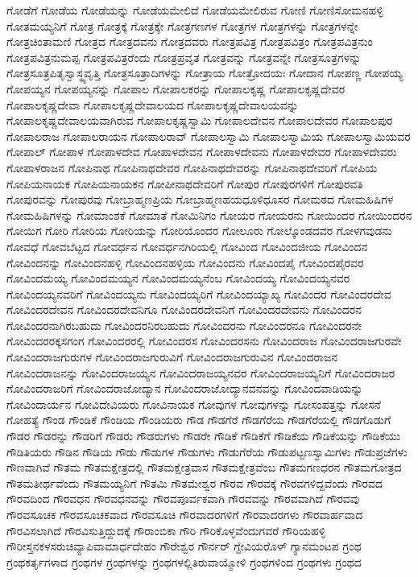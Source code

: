 {ಗೋಡೆಗೆ
ಗೋಡೆಯ
ಗೋಡೆಯನ್ನು
ಗೋಡೆಯಮೇಲಿದೆ
ಗೋಡೆಯಮೇಲಿರುವ
ಗೋಣಿ
ಗೋಣಿಸೋಮನಹಳ್ಳಿ
ಗೋತಮಯ್ಯನಿಗೆ
ಗೋತ್ರ
ಗೋತ್ರಕ್ಕೆ
ಗೋತ್ರಕ್ಕೇ
ಗೋತ್ರಗಣಗಳ
ಗೋತ್ರಗಳ
ಗೋತ್ರಗಳನ್ನು
ಗೋತ್ರಗಳನ್ನೇ
ಗೋತ್ರಚಿಂತಾಮಣಿ
ಗೋತ್ರದ
ಗೋತ್ರದವನು
ಗೋತ್ರದವರು
ಗೋತ್ರಪವಿತ್ರ
ಗೋತ್ರಪವಿತ್ರಂ
ಗೋತ್ರಪವಿತ್ರನುಂ
ಗೋತ್ರಪವಿತ್ರನುಮಪ್ಪ
ಗೋತ್ರಪವಿತ್ರರೆಂದು
ಗೋತ್ರಪ್ರವೃತ
ಗೋತ್ರವನ್ನು
ಗೋತ್ರವನ್ನೇ
ಗೋತ್ರಸೂತ್ರಗಳನ್ನು
ಗೋತ್ರಸೂತ್ರಪಿತೃಸ್ವಾಸ್ಥ್ಯವೃತ್ತಿ
ಗೋತ್ರಸೂತ್ರಾದಿಗಳನ್ನು
ಗೋತ್ರಾಯ
ಗೋತ್ರೋದಯಃ
ಗೋದಾನ
ಗೋಪಣ್ಣ
ಗೋಪಯ್ಯ
ಗೋಪಯ್ಯನ
ಗೋಪಯ್ಯನನ್ನು
ಗೋಪಾಲ
ಗೋಪಾಲಕರನ್ನು
ಗೋಪಾಲಕೃಷ್ಣ
ಗೋಪಾಲಕೃಷ್ಣದೇವರ
ಗೋಪಾಲಕೃಷ್ಣದೇವಾ
ಗೋಪಾಲಕೃಷ್ಣದೇವಾಲಯದ
ಗೋಪಾಲಕೃಷ್ಣದೇವಾಲಯವನ್ನು
ಗೋಪಾಲಕೃಷ್ಣದೇವಾಲಯವಾಗಿರುವ
ಗೋಪಾಲಕೃಷ್ಣಸ್ವಾಮಿ
ಗೋಪಾಲದೇವನ
ಗೋಪಾಲದೇವರ
ಗೋಪಾಲಪುರ
ಗೋಪಾಲರಾಜ
ಗೋಪಾಲರಾಯನ
ಗೋಪಾಲರಾವ್
ಗೋಪಾಲಸ್ವಾಮಿ
ಗೋಪಾಲಸ್ವಾಮಿಯ
ಗೋಪಾಲಸ್ವಾಮಿಯವರ
ಗೋಪಾಲ್
ಗೋಪಾಳ
ಗೋಪಾಳದೇವ
ಗೋಪಾಳದೇವನ
ಗೋಪಾಳದೇವನು
ಗೋಪಾಳದೇವರ
ಗೋಪಾಳದೇವರು
ಗೋಪಾಳರಾಜನ
ಗೋಪಿನಾಥ
ಗೋಪಿನಾಥದೇವರ
ಗೋಪಿನಾಥದೇವರನ್ನು
ಗೋಪಿನಾಥದೇವರಿಗೆ
ಗೋಪಿಯ
ಗೋಪಿಯನಾಯಕ
ಗೋಪಿಯನಾಯಕನ
ಗೋಪೀನಾಥದೇವರಿಗೆ
ಗೋಪುರ
ಗೋಪುರಗಳಿಗೆ
ಗೋಪುರವತಿ
ಗೋಪುರವನ್ನು
ಗೋಪುರವು
ಗೋಬ್ರಾಹ್ಮಣಪ್ರಿಯ
ಗೋಬ್ರಾಹ್ಮಣಹಯಧೂಳಿಧೂಸರ
ಗೋಮಠದ
ಗೋಮಹಿಷಿಗಳ
ಗೋಮಹಿಷಿಗಳನ್ನು
ಗೋಮಾಂಶಕೆ
ಗೋಮಾತೆ
ಗೋಮಿನಿಗಂ
ಗೋಯರ
ಗೋಯರನು
ಗೋಯಿಂದರ
ಗೋಯಿಂದರನ
ಗೋಯಿಗ
ಗೋರಿ
ಗೋರಿಯ
ಗೋರಿಯನ್ನು
ಗೋರಿಯೊಂದರ
ಗೋಲೂರು
ಗೋಲ್ಕೊಂಡದವರ
ಗೋಳಗವುಡನು
ಗೋವಧೆ
ಗೋವಬೆಟ್ಟದ
ಗೋವರ್ಧನ
ಗೋವರ್ಧನಗಿರಿಯಲ್ಲಿ
ಗೋವಿಂದ
ಗೋವಿಂದಜೀಯ
ಗೋವಿಂದನ
ಗೋವಿಂದನನ್ನು
ಗೋವಿಂದನಹಳ್ಳಿ
ಗೋವಿಂದನಹಳ್ಳಿಯ
ಗೋವಿಂದನು
ಗೋವಿಂದಪೈ
ಗೋವಿಂದಪೈರವರ
ಗೋವಿಂದಮಯ್ಯ
ಗೋವಿಂದಮಯ್ಯನ
ಗೋವಿಂದಮಯ್ಯನೆಂಬ
ಗೋವಿಂದಯ್ಯ
ಗೋವಿಂದಯ್ಯನವರ
ಗೋವಿಂದಯ್ಯನವರಿಗೆ
ಗೋವಿಂದಯ್ಯನು
ಗೋವಿಂದಯ್ಯರಿಗೆ
ಗೋವಿಂದಯ್ಯಾಖ್ಯ
ಗೋವಿಂದರ
ಗೋವಿಂದರದೇವ
ಗೋವಿಂದರದೇವನ
ಗೋವಿಂದರದೇವನಿಗೂ
ಗೋವಿಂದರದೇವನಿಗೆ
ಗೋವಿಂದರದೇವನು
ಗೋವಿಂದರನ
ಗೋವಿಂದರನಾಗಿರಬಹುದು
ಗೋವಿಂದರನಿರಬಹುದು
ಗೋವಿಂದರನು
ಗೋವಿಂದರನೂ
ಗೋವಿಂದರನೇ
ಗೋವಿಂದರರಕ್ಕಸಗಂಗ
ಗೋವಿಂದರರಲ್ಲಿ
ಗೋವಿಂದರಸ
ಗೋವಿಂದರಸನು
ಗೋವಿಂದರಾಜ
ಗೋವಿಂದರಾಜಗುರವೇ
ಗೋವಿಂದರಾಜಗುರುಗಳ
ಗೋವಿಂದರಾಜಗುರುವಿಗೆ
ಗೋವಿಂದರಾಜಗುರುವಿನ
ಗೋವಿಂದರಾಜನ
ಗೋವಿಂದರಾಜನನ್ನು
ಗೋವಿಂದರಾಜಯ್ಯನ
ಗೋವಿಂದರಾಜಯ್ಯನವರ
ಗೋವಿಂದರಾಜಯ್ಯನಿಗೆ
ಗೋವಿಂದರಾಜರ
ಗೋವಿಂದರಾಜರಿಗೆ
ಗೋವಿಂದರಾಜೋದ್ಯಾನ
ಗೋವಿಂದರಾಜೋದ್ಯಾನವನವನ್ನು
ಗೋವಿಂದವಾಡಿಯನ್ನು
ಗೋವಿಂದಾರ್ಯನ
ಗೋವಿದೇವಿಯರು
ಗೋವಿನಾಯಕ
ಗೋವುಗಳ
ಗೋವುಗಳನ್ನು
ಗೋಸಂಪತ್ತನ್ನು
ಗೋಸನೆ
ಗೋಹತ್ಯೆ
ಗೌಂಡ
ಗೌಂಡಿಕೆ
ಗೌಂಡಿಯ
ಗೌಂಡಿಯರು
ಗೌಡ
ಗೌಡಗೆರೆ
ಗೌಡಗೆರೆಯ
ಗೌಡಗೆರೆಯಲ್ಲಿ
ಗೌಡಗೊಡುಗೆ
ಗೌಡರ
ಗೌಡರನ್ನು
ಗೌಡರಿಗೆ
ಗೌಡರು
ಗೌಡರುಗಳು
ಗೌಡರೇ
ಗೌಡಿಕೆ
ಗೌಡಿಕೆಗೆ
ಗೌಡಿಕೆಯ
ಗೌಡಿಕೆಯನ್ನು
ಗೌಡಿಕೆಯು
ಗೌಡಿತಿಯರು
ಗೌಡಿನ
ಗೌಡಿಯ
ಗೌಡು
ಗೌಡುಗಳ
ಗೌಡುಗಳು
ಗೌಡುಗೆರೆಯ
ಗೌಡುಪಟ್ಟಣಸ್ವಾಮಿಗಳು
ಗೌಡುಪ್ರಜೆಗಳು
ಗೌಣವಾಗಿವೆ
ಗೌತಮ
ಗೌತಮಕ್ಷೇತ್ರದಲ್ಲಿ
ಗೌತಮಕ್ಷೇತ್ರವಾಸ
ಗೌತಮಕ್ಷೇತ್ರವೆಂಬ
ಗೌತಮಗಣಧರನ
ಗೌತಮಗೋತ್ರದ
ಗೌತಮತೀರ್ಥವೆಂದು
ಗೌತಮಯ್ಯನಿಗೆ
ಗೌತಮಿ
ಗೌತಮೇಶ್ವರ
ಗೌರವ
ಗೌರವಕ್ಕೆ
ಗೌರವಗಳಿದ್ದವೆಂದು
ಗೌರವದ
ಗೌರವದಿಂದ
ಗೌರವಧನ
ಗೌರವಧನವನ್ನು
ಗೌರವಪೂರ್ವಕವಾಗಿ
ಗೌರವವನ್ನು
ಗೌರವವಾಗಿದೆ
ಗೌರವವು
ಗೌರವಸೂಚಕ
ಗೌರವಸೂಚಕವಾದ
ಗೌರವಸೂಚಿ
ಗೌರವಾದರಗಳಿಗೆ
ಗೌರವಾದರಗಳು
ಗೌರವಾರ್ಹವಾದ
ಗೌರವಿಸಲಾಗಿದೆ
ಗೌರವಿಸುತ್ತಿದ್ದುದಕ್ಕೆ
ಗೌರಾಂಬಿಕಾ
ಗೌರಿ
ಗೌರಿಕೊಳ್ಳವೆಂದುಗವರೆ
ಗೌರಿಯಹಳ್ಳಿ
ಗೌರೀಸ್ತನಕಳಸರುಚಿವ್ಯಾಪಿವಾಮಾರ್ಧದೇಹಂ
ಗೌರೇಶ್ವರ
ಗೌರ್ನರ್
ಗ್ದೇವಿಯರೊಳ್
ಗ್ಯಾನಮಂಟಪ
ಗ್ರಂಥ
ಗ್ರಂಥಕರ್ತೃಗಳಾದ
ಗ್ರಂಥಗಳ
ಗ್ರಂಥಗಳನ್ನು
ಗ್ರಂಥಗಳಲ್ಲಿತಿರುವಾಯ್ಮೋಳಿ
ಗ್ರಂಥಗಳಿಂದ
ಗ್ರಂಥಗಳು
ಗ್ರಂಥದ
}
